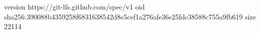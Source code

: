 version https://git-lfs.github.com/spec/v1
oid sha256:390088b4359258f6831638542d8e5cef1a276afe36e25fdc38588c755a9fb619
size 22114
